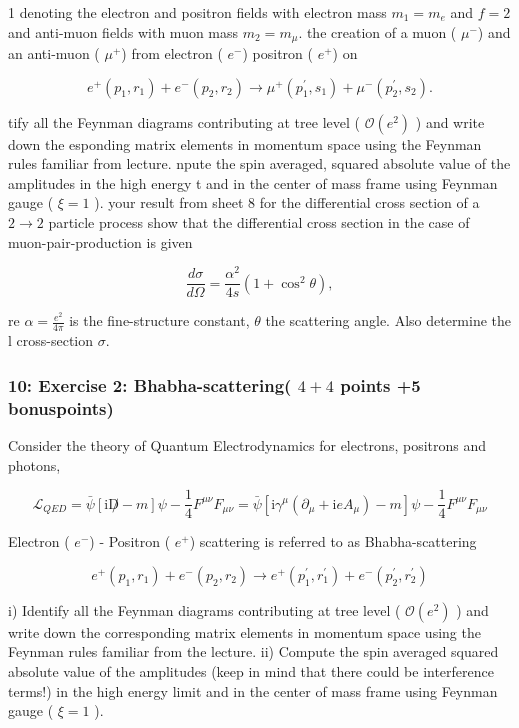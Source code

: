 \documentclass[10pt, letterpaper]{article}
\begin{document}
1 denoting the electron and positron fields with electron mass $m_1=m_e$ and $f=2$ and anti-muon fields with muon mass $m_2=m_\mu$.
the creation of a muon ( $\mu^{-}$) and an anti-muon ( $\mu^{+}$) from electron ( $e^{-}$) positron ( $e^{+}$) on

$$
e^{+}\left(p_1, r_1\right)+e^{-}\left(p_2, r_2\right) \rightarrow \mu^{+}\left(p_1^{\prime}, s_1\right)+\mu^{-}\left(p_2^{\prime}, s_2\right) .
$$

tify all the Feynman diagrams contributing at tree level ( $\mathcal{O}\left(e^2\right)$ ) and write down the esponding matrix elements in momentum space using the Feynman rules familiar from lecture.
npute the spin averaged, squared absolute value of the amplitudes in the high energy t and in the center of mass frame using Feynman gauge ( $\xi=1$ ).
your result from sheet 8 for the differential cross section of a $2 \rightarrow 2$ particle process show that the differential cross section in the case of muon-pair-production is given

$$
\frac{d \sigma}{d \Omega}=\frac{\alpha^2}{4 s}\left(1+\cos ^2 \theta\right),
$$

re $\alpha=\frac{e^2}{4 \pi}$ is the fine-structure constant, $\theta$ the scattering angle. Also determine the l cross-section $\sigma$.


\subsubsection{10: Exercise 2: Bhabha-scattering( $4+4$ points +5 bonuspoints)}
Consider the theory of Quantum Electrodynamics for electrons, positrons and photons,

$$
\mathcal{L}_{Q E D}=\bar{\psi}[\mathrm{i} \not D-m] \psi-\frac{1}{4} F^{\mu \nu} F_{\mu \nu}=\bar{\psi}\left[\mathrm{i} \gamma^\mu\left(\partial_\mu+\mathrm{i} e A_\mu\right)-m\right] \psi-\frac{1}{4} F^{\mu \nu} F_{\mu \nu}
$$


Electron ( $e^{-}$) - Positron ( $e^{+}$) scattering is referred to as Bhabha-scattering

$$
e^{+}\left(p_1, r_1\right)+e^{-}\left(p_2, r_2\right) \rightarrow e^{+}\left(p_1^{\prime}, r_1^{\prime}\right)+e^{-}\left(p_2^{\prime}, r_2^{\prime}\right)
$$

i) Identify all the Feynman diagrams contributing at tree level ( $\mathcal{O}\left(e^2\right)$ ) and write down the corresponding matrix elements in momentum space using the Feynman rules familiar from the lecture.
ii) Compute the spin averaged squared absolute value of the amplitudes (keep in mind that there could be interference terms!) in the high energy limit and in the center of mass frame using Feynman gauge ( $\xi=1$ ).
\end{document}
